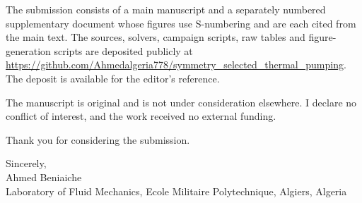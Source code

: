 \documentclass[11pt]{article}
\begin{document}
\medskip
The submission consists of a main manuscript and a separately numbered supplementary document
whose figures use S-numbering and are each cited from the main text. The sources, solvers,
campaign scripts, raw tables and figure-generation scripts are deposited publicly at
\url{https://github.com/Ahmedalgeria778/symmetry_selected_thermal_pumping}. The deposit is
available for the editor's reference.

\medskip
The manuscript is original and is not under consideration elsewhere. I declare no conflict of
interest, and the work received no external funding.

\medskip
Thank you for considering the submission.

\smallskip
Sincerely,\\[3pt]
Ahmed Beniaiche\\
Laboratory of Fluid Mechanics, Ecole Militaire Polytechnique, Algiers, Algeria
\end{document}
